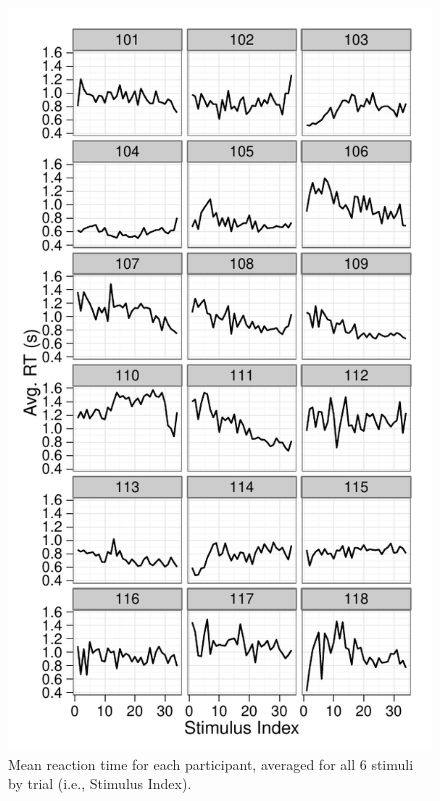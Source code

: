 \documentclass[doc,12pt]{apa}        %
\begin{document}
\begin{figure}[tp]
	\includegraphics{f_all_sS_rt}
    \centering
	\caption{Mean reaction time for each participant, averaged for all 6 stimuli by trial (i.e., Stimulus Index).}
	\label{fig:srt}
\end{figure}
\end{document}
